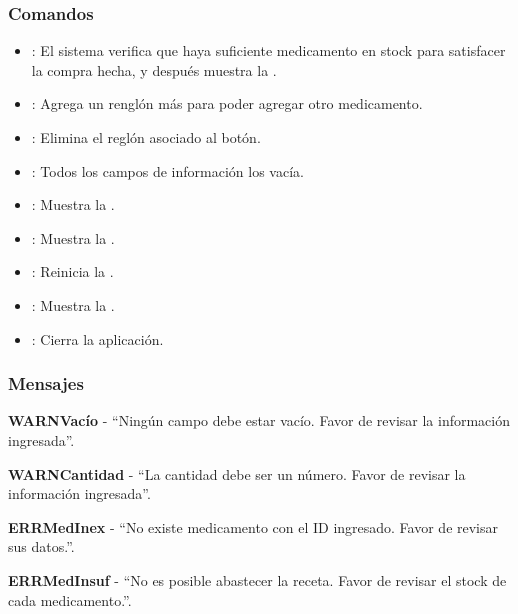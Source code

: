 \subsubsection{Comandos}
\begin{itemize}
		\item {}: El sistema verifica que haya suficiente medicamento en stock para satisfacer la compra hecha, y despu\'es muestra la \label{IUConfirmar}.
		\item {}: Agrega un rengl\'on m\'as para poder agregar otro medicamento.
		\item {}: Elimina el regl\'on asociado al bot\'on.
		\item {}: Todos los campos de informaci\'on los vac\'ia.
		\item {}: Muestra la \label{IUConsulta}.
		\item {}: Muestra la \label{IUBusqueda}.
		\item {}: Reinicia la \label{IUCompra}.
		\item {}: Muestra la \label{IUCompra}.
		\item {}: Cierra la aplicaci\'on.
\end{itemize}

\subsubsection{Mensajes}
	\begin{Citemize}
		\item {\bf WARNVac\'io} - "`Ning\'un campo debe estar vac\'io. Favor de revisar la informaci\'on ingresada"'.
		\item {\bf WARNCantidad} - "`La cantidad debe ser un n\'umero. Favor de revisar la informaci\'on ingresada"'.
		\item {\bf ERRMedInex} - "`No existe medicamento con el ID ingresado. Favor de revisar sus datos."'.
		\item {\bf ERRMedInsuf} - "`No es posible abastecer la receta. Favor de revisar el stock de cada medicamento."'.
	\end{Citemize}